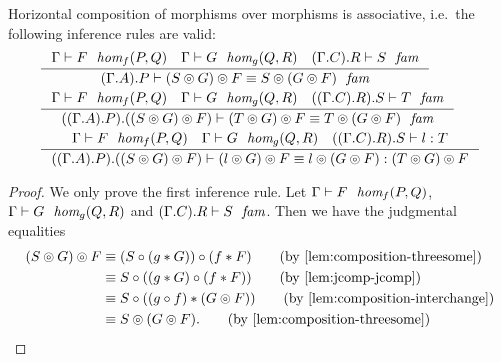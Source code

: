 \begin{lem}\label{lem:jfcomp-jfcomp}
Horizontal composition of morphisms over morphisms is associative, i.e.~the
following inference rules are valid:
\begin{align*}
& \inference
  { \jfhom{\Gamma}{A}{B}{f}{P}{Q}{F}
    \jfhom{\Gamma}{B}{C}{g}{Q}{R}{G}
    \jfam{{{\Gamma}{C}}{R}}{S}
    }
  { \jfameq
      {{{\Gamma}{A}}{P}}
      {\jfcomp{A}{f}{P}{F}{\jfcomp{B}{g}{Q}{G}{S}}}
      {\jfcomp{A}{\jcomp{A}{f}{g}}{P}{\jfcomp{A}{f}{P}{F}{G}}{S}}
    }
  \\
& \inference
  { \jfhom{\Gamma}{A}{B}{f}{P}{Q}{F}
    \jfhom{\Gamma}{B}{C}{g}{Q}{R}{G}
    \jfam{{{{\Gamma}{C}}{R}}{S}}{T}
    }
  { \jfameq
      {{{{\Gamma}{A}}{P}}{\jfcomp{A}{f}{P}{F}{\jfcomp{B}{g}{Q}{G}{S}}}}
      {\jfcomp{A}{f}{P}{F}{\jfcomp{B}{g}{Q}{G}{T}}}
      {\jfcomp{A}{\jcomp{A}{f}{g}}{P}{\jfcomp{A}{f}{P}{F}{G}}{T}}
    }
  \\
& \inference
  { \jfhom{\Gamma}{A}{B}{f}{P}{Q}{F}
    \jfhom{\Gamma}{B}{C}{g}{Q}{R}{G}
    \jterm{{{{\Gamma}{C}}{R}}{S}}{T}{l}
    }
  { \jtermeq
      {{{{\Gamma}{A}}{P}}{\jfcomp{A}{f}{P}{F}{\jfcomp{B}{g}{Q}{G}{S}}}}
      {\jfcomp{A}{f}{P}{F}{\jfcomp{B}{g}{Q}{G}{T}}}
      {\jfcomp{A}{f}{P}{F}{\jfcomp{B}{g}{Q}{G}{l}}}
      {\jfcomp{A}{\jcomp{A}{f}{g}}{P}{\jfcomp{A}{f}{P}{F}{G}}{l}}
    }
\end{align*}
\end{lem}

\begin{proof}
We only prove the first inference rule. Let
$\jfhom{\Gamma}{A}{B}{f}{P}{Q}{F}$, $\jfhom{\Gamma}{B}{C}{g}{Q}{R}{G}$ and
$\jfam{{{\Gamma}{C}}{R}}{S}$. Then we have the judgmental equalities
\begin{align*}
\jfcomp{A}{f}{P}{F}{\jfcomp{B}{g}{Q}{G}{S}}
& \jdeq
  \jcomp{{A}{P}}{\jvcomp{P}{f}{F}}{\jcomp{{B}{Q}}{\jvcomp{Q}{g}{G}}{S}}
  \tag{by \autoref{lem:composition-threesome}}
  \\
& \jdeq
  \jcomp{{A}{P}}{\jcomp{{A}{P}}{\jvcomp{P}{f}{F}}{\jvcomp{Q}{g}{G}}}{S}
  \tag{by \autoref{lem:jcomp-jcomp}}
  \\
& \jdeq
  \jcomp{{A}{P}}{\jvcomp{P}{\jcomp{A}{f}{g}}{\jfcomp{A}{f}{P}{F}{G}}}{S}
  \tag{by \autoref{lem:composition-interchange}}
  \\
& \jdeq
  \jfcomp{A}{\jcomp{A}{f}{g}}{P}{\jfcomp{A}{f}{P}{F}{G}}{S}.
  \tag{by \autoref{lem:composition-threesome}}
\end{align*}
\end{proof}

